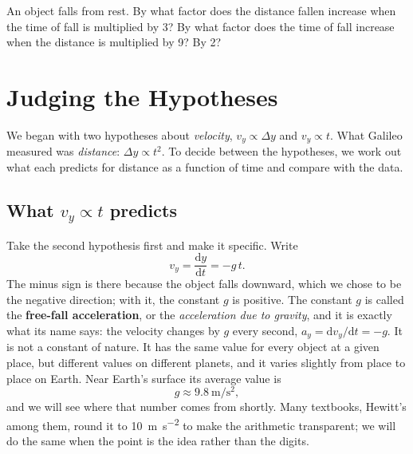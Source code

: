 \documentclass[11pt,twoside,openany]{book}
\newcommand{\dd}{\mathrm{d}}
\newcommand{\deriv}[2]{\frac{\dd #1}{\dd #2}}
\newcounter{check}[chapter]
\begin{document}
\begin{checkbox}
An object falls from rest. By what factor does the distance fallen increase when the time of fall is multiplied by \num{3}? By what factor does the time of fall increase when the distance is multiplied by \num{9}? By \num{2}?
\end{checkbox}

\section{Judging the Hypotheses}
\label{sec:judging}

We began with two hypotheses about \emph{velocity}, $v_y \propto \Delta y$ and $v_y \propto t$. What Galileo measured was \emph{distance}: $\Delta y \propto t^2$. To decide between the hypotheses, we work out what each predicts for distance as a function of time and compare with the data.

\subsection{What \texorpdfstring{$v_y \propto t$}{v proportional to t} predicts}

Take the second hypothesis first and make it specific. Write
\begin{equation}
v_y = \deriv{y}{t} = -g\,t.
\label{eq:vgt}
\end{equation}
The minus sign is there because the object falls downward, which we chose to be the negative direction; with it, the constant $g$ is positive. The constant $g$ is called the \textbf{free-fall acceleration}, or the \emph{acceleration due to gravity}, and it is exactly what its name says: the velocity changes by $g$ every second, $a_y = \dd v_y/\dd t = -g$. It is not a constant of nature. It has the same value for every object at a given place, but different values on different planets, and it varies slightly from place to place on Earth. Near Earth's surface its average value is
\[
g \approx \SI{9.8}{\metre\per\second\squared},
\]
and we will see where that number comes from shortly. Many textbooks, Hewitt's among them, round it to \SI{10}{\metre\per\second\squared} to make the arithmetic transparent; we will do the same when the point is the idea rather than the digits.
\end{document}
